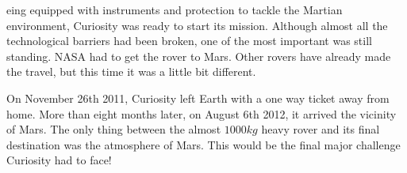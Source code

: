 eing equipped with instruments and protection to tackle the Martian environment, Curiosity was ready to start its mission.
Although almost all the technological barriers had been broken, one of the most important was still standing.
NASA had to get the rover to Mars.
Other rovers have already made the travel, but this time it was a little bit different.

On November 26th 2011, Curiosity left Earth with a one way ticket away from home.
More than eight months later, on August 6th 2012, it arrived the vicinity of Mars.
The only thing between the almost $1000kg$ heavy rover and its final destination was the atmosphere of Mars.
This would be the final major challenge Curiosity had to face!